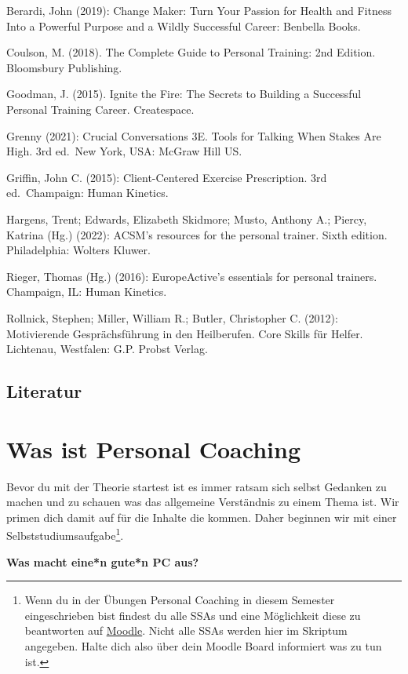 \documentclass[
  letterpaper,
  DIV=11,
  numbers=noendperiod]{scrreprt}
\begin{document}
Berardi, John (2019): Change Maker: Turn Your Passion for Health and
Fitness Into a Powerful Purpose and a Wildly Successful Career: Benbella
Books.

Coulson, M. (2018). The Complete Guide to Personal Training: 2nd
Edition. Bloomsbury Publishing.

Goodman, J. (2015). Ignite the Fire: The Secrets to Building a
Successful Personal Training Career. Createspace.

Grenny (2021): Crucial Conversations 3E. Tools for Talking When Stakes
Are High. 3rd ed.~New York, USA: McGraw Hill US.

Griffin, John C. (2015): Client-Centered Exercise Prescription. 3rd
ed.~Champaign: Human Kinetics.

Hargens, Trent; Edwards, Elizabeth Skidmore; Musto, Anthony A.; Piercy,
Katrina (Hg.) (2022): ACSM's resources for the personal trainer. Sixth
edition. Philadelphia: Wolters Kluwer.

Rieger, Thomas (Hg.) (2016): EuropeActive's essentials for personal
trainers. Champaign, IL: Human Kinetics.

Rollnick, Stephen; Miller, William R.; Butler, Christopher C. (2012):
Motivierende Gesprächsführung in den Heilberufen. Core Skills für
Helfer. Lichtenau, Westfalen: G.P. Probst Verlag.

\section{Literatur}\label{literatur-1}


\chapter{Was ist Personal Coaching}\label{sec-was-ist-personal-coaching}

Bevor du mit der Theorie startest ist es immer ratsam sich selbst
Gedanken zu machen und zu schauen was das allgemeine Verständnis zu
einem Thema ist. Wir primen dich damit auf für die Inhalte die kommen.
Daher beginnen wir mit einer Selbststudiumsaufgabe\footnote{Wenn du in
  der Übungen Personal Coaching in diesem Semester eingeschrieben bist
  findest du alle SSAs und eine Möglichkeit diese zu beantworten auf
  \href{https://moodle.univie.ac.at/my/}{Moodle}. Nicht alle SSAs werden
  hier im Skriptum angegeben. Halte dich also über dein Moodle Board
  informiert was zu tun ist.}.

\textbf{Was macht eine*n gute*n PC aus?}
\end{document}
